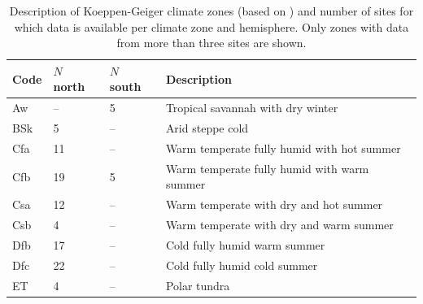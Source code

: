 \documentclass{myreport}
\begin{document}
\begin{table}
\caption{Description of Koeppen-Geiger climate zones (based on \cite{falge17}) and number of sites for which data is available per climate zone and hemisphere. Only zones with data from more than three sites are shown.} 
\centering
\begin{tabular}{llll}
  \toprule
  Code & $N$ north & $N$ south & Description \\ 
  \midrule
   Aw   & -- & 5 &  Tropical savannah with dry winter \\ 
   BSk  & 5 & -- & Arid steppe cold \\ 
   Cfa  & 11 & -- & Warm temperate fully humid with hot summer \\ 
   Cfb  & 19 & 5 & Warm temperate fully humid with warm summer \\ 
   Csa  & 12 & -- & Warm temperate with dry and hot summer \\ 
   Csb  & 4 & -- & Warm temperate with dry and warm summer \\ 
   Dfb  & 17 & -- & Cold fully humid warm summer \\ 
   Dfc  & 22 & -- & Cold fully humid cold summer \\ 
   ET   & 4 & -- & Polar tundra \\ 
   \bottomrule
  \end{tabular}
  \label{tab:kgclimate}
\end{table}
\end{document}
